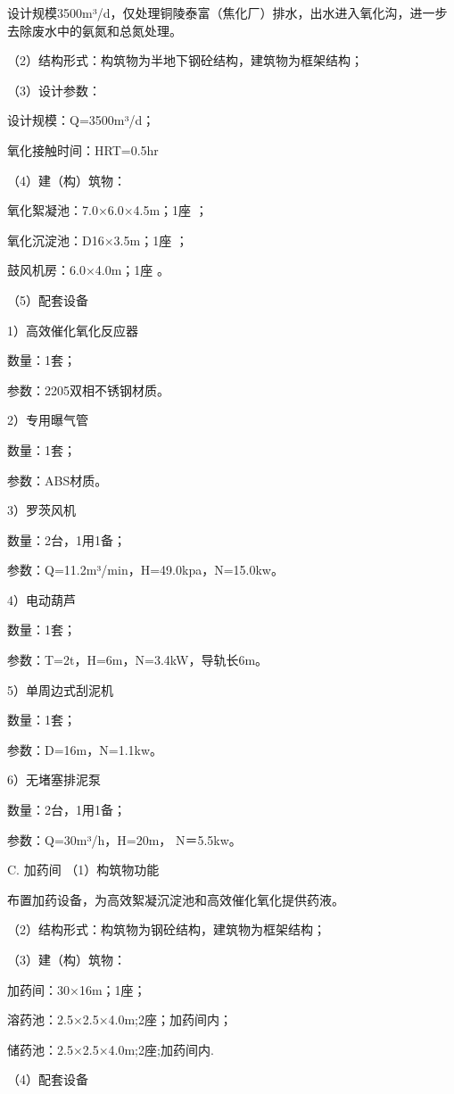设计规模3500m³/d，仅处理铜陵泰富（焦化厂）排水，出水进入氧化沟，进一步去除废水中的氨氮和总氮处理。\par 
（2）结构形式：构筑物为半地下钢砼结构，建筑物为框架结构；\par 
（3）设计参数：\par 
设计规模：Q=3500m³/d；\par 
氧化接触时间：HRT=0.5hr\par 
（4）建（构）筑物：\par 
氧化絮凝池：7.0×6.0×4.5m；1座	；\par 
氧化沉淀池：D16×3.5m；1座	；\par 
鼓风机房：6.0×4.0m；1座	。\par 
（5）配套设备	\par 
1）高效催化氧化反应器	\par 
数量：1套；\par 
参数：2205双相不锈钢材质。\par 
2）专用曝气管	\par 
数量：1套；\par 
参数：ABS材质。\par 
3）罗茨风机	\par 
数量：2台，1用1备；\par 
参数：Q=11.2m³/min，H=49.0kpa，N=15.0kw。\par 
4）电动葫芦	\par 
数量：1套；\par 
参数：T=2t，H=6m，N=3.4kW，导轨长6m。\par 
5）单周边式刮泥机	\par 
数量：1套；\par 
参数：D=16m，N=1.1kw。\par 
6）无堵塞排泥泵	\par 
数量：2台，1用1备；\par 
参数：Q=30m³/h，H=20m， N＝5.5kw。\par 
C. 加药间 
（1）构筑物功能	\par 
布置加药设备，为高效絮凝沉淀池和高效催化氧化提供药液。\par 
（2）结构形式：构筑物为钢砼结构，建筑物为框架结构；\par 
（3）建（构）筑物：				\par 
加药间：30×16m；1座；	\par 
溶药池：2.5×2.5×4.0m;2座；加药间内；\par 
储药池：2.5×2.5×4.0m;2座;加药间内.\par 
（4）配套设备	\par 
